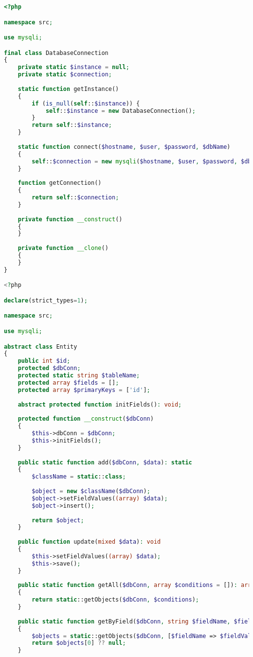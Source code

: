 
%
%
%

\begin{lstlisting}[language=PHP, frame=none]
<?php

namespace src;

use mysqli;

final class DatabaseConnection
{
	private static $instance = null;
	private static $connection;
	
	static function getInstance()
	{
		if (is_null(self::$instance)) {
			self::$instance = new DatabaseConnection();
		}
		return self::$instance;
	}
	
	static function connect($hostname, $user, $password, $dbName)
	{
		self::$connection = new mysqli($hostname, $user, $password, $dbName);
	}
	
	function getConnection()
	{
		return self::$connection;
	}
	
	private function __construct()
	{
	}
	
	private function __clone()
	{
	}
}

<?php

declare(strict_types=1);

namespace src;

use mysqli;

abstract class Entity
{
	public int $id;
	protected $dbConn;
	protected static string $tableName;
	protected array $fields = [];
	protected array $primaryKeys = ['id'];
	
	abstract protected function initFields(): void;
	
	protected function __construct($dbConn)
	{
		$this->dbConn = $dbConn;
		$this->initFields();
	}
	
	public static function add($dbConn, $data): static
	{
		$className = static::class;
		
		$object = new $className($dbConn);
		$object->setFieldValues((array) $data);
		$object->insert();
		
		return $object;
	}
	
	public function update(mixed $data): void
	{
		$this->setFieldValues((array) $data);
		$this->save();
	}
	
	public static function getAll($dbConn, array $conditions = []): array
	{
		return static::getObjects($dbConn, $conditions);
	}
	
	public static function getByField($dbConn, string $fieldName, $fieldValue): ?static
	{
		$objects = static::getObjects($dbConn, [$fieldName => $fieldValue]);
		return $objects[0] ?? null;
	}
	

\end{lstlisting}
